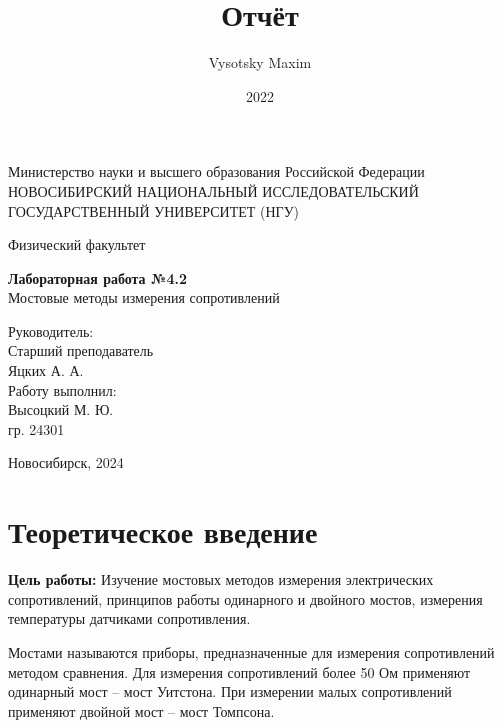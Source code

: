 \documentclass[a4paper,12pt]{article}
\author{Vysotsky Maxim}
\title{Отчёт}
\date{2022}
\begin{document}
	\begin{titlepage}
		\begin{center}
			{Министерство науки и высшего образования Российской Федерации
				НОВОСИБИРСКИЙ НАЦИОНАЛЬНЫЙ ИССЛЕДОВАТЕЛЬСКИЙ
				ГОСУДАРСТВЕННЫЙ УНИВЕРСИТЕТ (НГУ)}
		\end{center}
		\begin{center}
			{Физический факультет}
		\end{center}
		
		
		\vspace{8cm}
		{
			\begin{center}
				{\bf Лабораторная работа №4.2}\\
				Мостовые методы измерения сопротивлений
			\end{center}
		}
		\vspace{2cm}
		\begin{flushright}
			{Руководитель:\\ Старший преподаватель\\
				Яцких А. А.\\
				Работу выполнил:\\
				Высоцкий М. Ю.\\
				\vspace{0.2cm}
				гр. 24301}
		\end{flushright}
		\vspace{3cm}
		\begin{center}
			Новосибирск, 2024
		\end{center}
	\end{titlepage}

\section{Теоретическое введение}
\textbf{Цель работы:} Изучение мостовых методов измерения электрических сопротивлений, принципов работы одинарного и двойного мостов, измерения температуры датчиками сопротивления.

    Мостами называются приборы, предназначенные для измерения сопротивлений
методом сравнения. Для измерения сопротивлений более 50 Ом применяют одинарный мост – мост Уитстона. При измерении малых сопротивлений применяют двойной мост – мост Томпсона.
\end{document}
